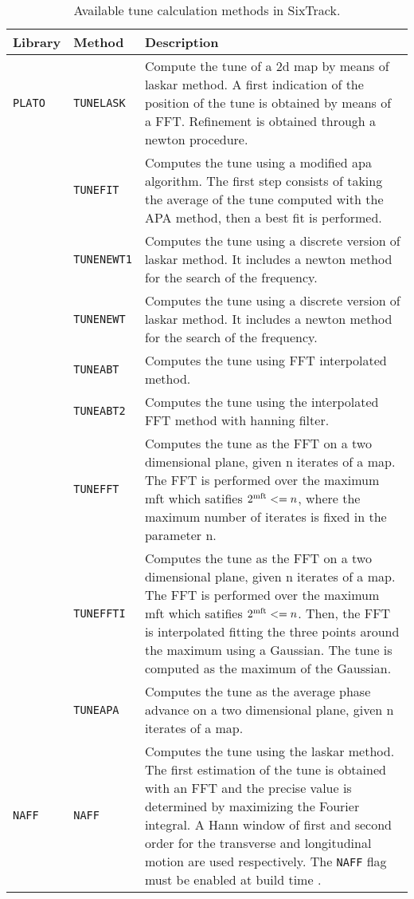 \begin{table}[H]
\begin{center}
    \caption{Available tune calculation methods in SixTrack.}
    \label{fma:tab:1}
    \begin{tabularx}{\textwidth}{|l|l|X|}
    \hline
    \rowcolor{blue!30}
    \textbf{Library} & \textbf{Method} & \textbf{Description} \\
    \hline
    \texttt{PLATO} \cite{plato1,plato2}
    & \texttt{TUNELASK} & Compute the tune of a 2d map by means of laskar method. A first indication of the position of the tune is obtained by means of a FFT. Refinement is obtained through a newton procedure.\\
    \cline{2-3}
    & \texttt{TUNEFIT} & Computes the tune using a modified apa algorithm. The first step consists of taking the average of the tune computed with the APA method, then a best fit is performed.\\
    \cline{2-3}
    & \texttt{TUNENEWT1} & Computes the tune using a discrete version of laskar method. It includes a newton method for the search of the frequency.\\
    \cline{2-3}
    & \texttt{TUNENEWT} & Computes the tune using a discrete version of laskar method. It includes a newton method for the search of the frequency.\\
    \cline{2-3}
    & \texttt{TUNEABT} & Computes the tune using FFT interpolated method.\\
    \cline{2-3}
    & \texttt{TUNEABT2} & Computes the tune using the interpolated FFT method with hanning filter.\\
    \cline{2-3}
    & \texttt{TUNEFFT} & Computes the tune as the FFT on a two dimensional plane, given n iterates of a map. The FFT is performed over the maximum mft which satifies $2^{\rm mft} <= n$, where the maximum number of iterates is fixed in the parameter n.\\
    \cline{2-3}
    & \texttt{TUNEFFTI} & Computes the tune as the FFT on a two dimensional plane, given n iterates of a map. The FFT is performed over the maximum mft which satifies $2^{\rm mft} <= n$. Then, the FFT is interpolated fitting the three points around the maximum using a Gaussian. The tune is computed as the maximum of the Gaussian.\\
    \cline{2-3}
    & \texttt{TUNEAPA} & Computes the tune as the average phase advance on a two dimensional plane, given n iterates of a map. \\
    \hline
    \texttt{NAFF} \cite{NAFFpaper, NAFFpaper2}
    & \texttt{NAFF} & Computes the tune using the laskar method. The first estimation of the tune is obtained with an FFT and the precise value is determined by maximizing the Fourier integral. A Hann window of first and second order for the transverse and longitudinal motion are used respectively. The \texttt{NAFF} flag must be enabled at build time \cite{sixbuild}. \\
    \hline
    \end{tabularx}
\end{center}
\end{table}

